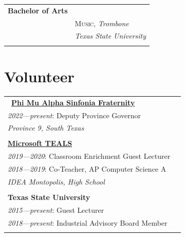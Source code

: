 \documentclass[10pt]{article} %
\newcommand\tab[1][1cm]{\hspace*{#1}}
\begin{document}
\begin{minipage}[t]{0.44\textwidth}
\begin{tabular}{ll}
     

\textbf{Bachelor of Arts} \\ 
& \textsc{Music}, \textit{Trombone}\\ 
& \textit{Texas State University}\\ \\

\end{tabular}




\section{Volunteer} 

\begin{tabular}{ll}\
\href{https://province9.org}{\textbf{Phi Mu Alpha Sinfonia Fraternity}}\\
\tab\textit{2022—present}: Deputy Province Governor\\
\tab\tab\textit {Province 9, South Texas}\\
\\

\href{https://www.microsoft.com/en-us/teals}{\textbf{Microsoft TEALS}}\\
\tab\textit{2019—2020}: Classroom Enrichment Guest Lecturer\\
\tab\textit{2018—2019}: Co-Teacher, AP Computer Science A\\
\tab\tab\textit {IDEA Montopolis, High School}\\
\\

\textbf{Texas State University}\\
\tab\textit{2015—present}: Guest Lecturer\\
\tab\textit{2018—present}: Industrial Advisory Board Member\\
\\

\end{tabular}\\

\end{minipage}
\end{document}
